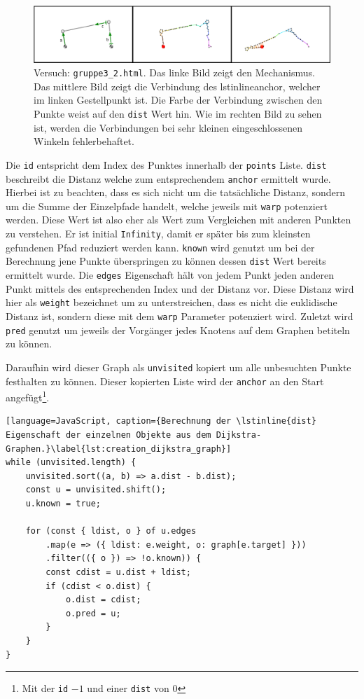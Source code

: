\begin{figure}
    \centering
    \includegraphics[width=\textwidth]{gfx/dijkstra_edit.png}
    \caption{Versuch: \lstinline{gruppe3_2.html}. Das linke Bild zeigt den Mechanismus. Das mittlere Bild zeigt die Verbindung des lstinline{anchor}, welcher im linken Gestellpunkt ist. Die Farbe der Verbindung zwischen den Punkte weist auf den \lstinline{dist} Wert hin.
    Wie im rechten Bild zu sehen ist, werden die Verbindungen bei sehr kleinen eingeschlossenen Winkeln fehlerbehaftet.}
    \label{fig:gruppe3_1}
\end{figure}

Die \lstinline{id} entspricht dem Index des Punktes innerhalb der \lstinline{points} Liste.
\lstinline{dist} beschreibt die Distanz welche zum entsprechendem \lstinline{anchor} ermittelt wurde.
Hierbei ist zu beachten, dass es sich nicht um die tatsächliche Distanz, sondern um die Summe der Einzelpfade handelt, welche jeweils mit \lstinline{warp} potenziert werden.
Diese Wert ist also eher als Wert zum Vergleichen mit anderen Punkten zu verstehen.
Er ist initial \lstinline{Infinity}, damit er später bis zum kleinsten gefundenen Pfad reduziert werden kann.
\lstinline{known} wird genutzt um bei der Berechnung jene Punkte überspringen zu können dessen \lstinline{dist} Wert bereits ermittelt wurde.
Die \lstinline{edges} Eigenschaft hält von jedem Punkt jeden anderen Punkt mittels des entsprechenden Index und der Distanz vor.
Diese Distanz wird hier als \lstinline{weight} bezeichnet um zu unterstreichen, dass es nicht die euklidische Distanz ist, sondern diese mit dem \lstinline{warp} Parameter potenziert wird.
Zuletzt wird \lstinline{pred} genutzt um jeweils der Vorgänger jedes Knotens auf dem Graphen betiteln zu können.

Daraufhin wird dieser Graph als \lstinline{unvisited} kopiert um alle unbesuchten Punkte festhalten zu können.
Dieser kopierten Liste wird der \lstinline{anchor} an den Start angefügt\footnote{Mit der \lstinline{id} $-1$ und einer \lstinline{dist} von 0}.

\begin{lstlisting}[language=JavaScript, caption={Berechnung der \lstinline{dist} Eigenschaft der einzelnen Objekte aus dem Dijkstra-Graphen.}\label{lst:creation_dijkstra_graph}]
while (unvisited.length) {
    unvisited.sort((a, b) => a.dist - b.dist);
    const u = unvisited.shift();
    u.known = true;

    for (const { ldist, o } of u.edges
        .map(e => ({ ldist: e.weight, o: graph[e.target] }))
        .filter(({ o }) => !o.known)) {
        const cdist = u.dist + ldist;
        if (cdist < o.dist) {
            o.dist = cdist;
            o.pred = u;
        }
    }
}
\end{lstlisting}

